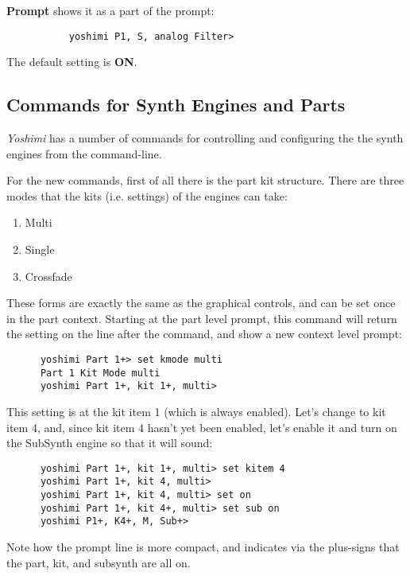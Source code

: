    \textbf{Prompt} shows it as a part of the prompt:

   \begin{verbatim}
           yoshimi P1, S, analog Filter>
   \end{verbatim}

   The default setting is \textbf{ON}.

\subsection{Commands for Synth Engines and Parts}
\label{subsec:command_line_command_synth_engines}

   \textsl{Yoshimi} has a number of commands for controlling and
   configuring the the synth engines from the command-line.

   For the new commands, first of all there is the part kit structure.
   There are three modes that the kits (i.e. settings)
   of the engines can take:
   
   \begin{enumerate}
      \item Multi
      \item Single
      \item Crossfade
   \end{enumerate}

   These forms are exactly the same as the graphical controls,
   and can be set once in the part context.
   Starting at the part level prompt, this command will return the setting on
   the line after the command,
   and show a new context level prompt:

   \begin{verbatim}
      yoshimi Part 1+> set kmode multi
      Part 1 Kit Mode multi
      yoshimi Part 1+, kit 1+, multi>
   \end{verbatim}

   This setting is at the kit item 1 (which is always enabled).
   Let's change to kit item 4, and, since
   kit item 4 hasn't yet been enabled, let's enable it and turn on the
   SubSynth engine so that it will sound:

   \begin{verbatim}
      yoshimi Part 1+, kit 1+, multi> set kitem 4
      yoshimi Part 1+, kit 4, multi>
      yoshimi Part 1+, kit 4, multi> set on
      yoshimi Part 1+, kit 4+, multi> set sub on
      yoshimi P1+, K4+, M, Sub+>
   \end{verbatim}

   Note how the prompt line is more compact, and indicates via the
   plus-signs that the part, kit, and subsynth are all on.

